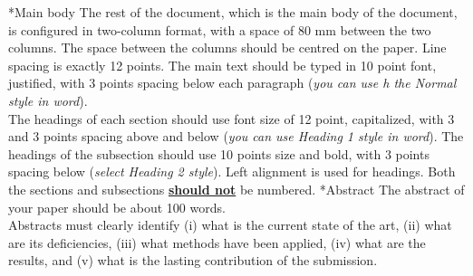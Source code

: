 \documentclass[twocolumn, a4paper,10pt]{article}
\makeatletter
\renewcommand\section{\@startsection{section}{1}{\z@}{3pt}{3pt}{\normalfont\large\bfseries}}
\renewcommand\subsection{\@startsection{subsection}{1}{\z@}{\z@}{\z@}{\normalfont\normalsize\bfseries}}
\renewcommand\subsection{\@startsection{subsection}{1}{\z@}{\z@}{0.1pt}{\normalfont\normalsize\bfseries}}
\makeatother
\begin{document}
\section*{Main body}
The rest of the document, which is the main body of the document, is configured in two-column format, with a space of 80 mm between the two columns. The space between the columns should be centred on the paper. Line spacing is exactly 12 points.
The main text should be typed in 10 point font, justified, with 3 points spacing below each paragraph (\textit{you can use h the Normal style in word}).\\
The headings of each section should use font size of 12 point, capitalized, with 3 and 3 points spacing above and below (\textit{you can use Heading 1 style in word}). The headings of the subsection should use 10 points size and bold, with 3 points spacing below (\textit{select Heading 2 style}). Left alignment is used for headings. Both the sections and subsections \underline{\textbf{should not}} be numbered.
\subsection*{Abstract}
The abstract of your paper should be about 100 words.\\
Abstracts must clearly identify (i) what is the current state of the art, (ii) what are its deficiencies, (iii) what methods have been applied, (iv) what are the results, and (v) what is the lasting contribution of the submission.
\end{document}
